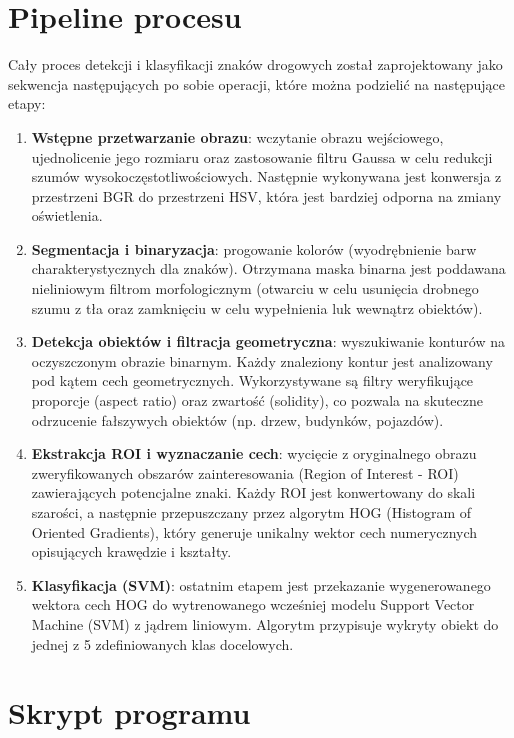 \documentclass[12pt,oneside]{article}
\begin{document}
\section{Pipeline procesu}
Cały proces detekcji i klasyfikacji znaków drogowych został zaprojektowany jako sekwencja następujących po sobie operacji, które można podzielić na następujące etapy:
\begin{enumerate}
    \item \textbf{Wstępne przetwarzanie obrazu}: wczytanie obrazu wejściowego, ujednolicenie jego rozmiaru oraz zastosowanie filtru Gaussa w celu redukcji szumów wysokoczęstotliwościowych. Następnie wykonywana jest konwersja z przestrzeni BGR do przestrzeni HSV, która jest bardziej odporna na zmiany oświetlenia.
    
    \item \textbf{Segmentacja i binaryzacja}: progowanie kolorów (wyodrębnienie barw charakterystycznych dla znaków). Otrzymana maska binarna jest poddawana nieliniowym filtrom morfologicznym (otwarciu w celu usunięcia drobnego szumu z tła oraz zamknięciu w celu wypełnienia luk wewnątrz obiektów).
    
    \item \textbf{Detekcja obiektów i filtracja geometryczna}: wyszukiwanie konturów na oczyszczonym obrazie binarnym. Każdy znaleziony kontur jest analizowany pod kątem cech geometrycznych. Wykorzystywane są filtry weryfikujące proporcje (aspect ratio) oraz zwartość (solidity), co pozwala na skuteczne odrzucenie fałszywych obiektów (np. drzew, budynków, pojazdów).
    
    \item \textbf{Ekstrakcja ROI i wyznaczanie cech}: wycięcie z oryginalnego obrazu zweryfikowanych obszarów zainteresowania (Region of Interest - ROI) zawierających potencjalne znaki. Każdy ROI jest konwertowany do skali szarości, a następnie przepuszczany przez algorytm HOG (Histogram of Oriented Gradients), który generuje unikalny wektor cech numerycznych opisujących krawędzie i kształty.
    
    \item \textbf{Klasyfikacja (SVM)}: ostatnim etapem jest przekazanie wygenerowanego wektora cech HOG do wytrenowanego wcześniej modelu Support Vector Machine (SVM) z jądrem liniowym. Algorytm przypisuje wykryty obiekt do jednej z 5 zdefiniowanych klas docelowych.
\end{enumerate}

\section{Skrypt programu}
\end{document}
